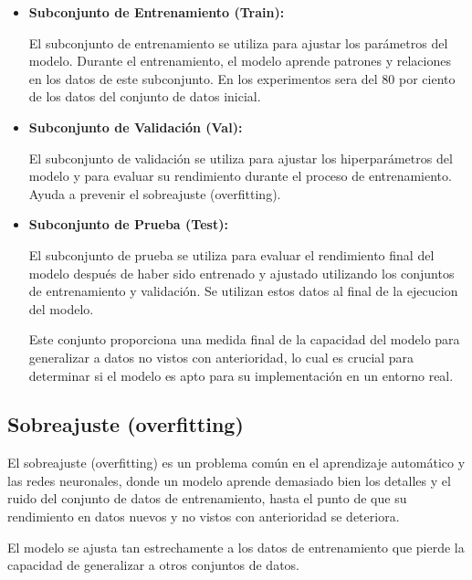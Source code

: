 \begin{itemize}
	
\item
\textbf{Subconjunto de Entrenamiento (Train):}

	El subconjunto de entrenamiento se utiliza para ajustar los parámetros del modelo. Durante el entrenamiento, el modelo aprende patrones y relaciones en los datos de este subconjunto. En los experimentos sera del 80 por ciento de los datos del conjunto de datos inicial.

\item 
\textbf{Subconjunto de Validación (Val):}

	El subconjunto de validación se utiliza para ajustar los hiperparámetros del modelo y para evaluar su rendimiento durante el proceso de entrenamiento. Ayuda a prevenir el sobreajuste (overfitting). 
	
\item 
\textbf{Subconjunto de Prueba (Test):}


	El subconjunto de prueba se utiliza para evaluar el rendimiento final del modelo después de haber sido entrenado y ajustado utilizando los conjuntos de entrenamiento y validación. Se utilizan estos datos al final de la ejecucion del modelo.
	
	Este conjunto proporciona una medida final de la capacidad del modelo para generalizar a datos no vistos con anterioridad, lo cual es crucial para determinar si el modelo es apto para su implementación en un entorno real.
	
\end{itemize}



\subsection{Sobreajuste (overfitting)}

	El sobreajuste (overfitting) es un problema común en el aprendizaje automático y las redes neuronales, donde un modelo aprende demasiado bien los detalles y el ruido del conjunto de datos de entrenamiento, hasta el punto de que su rendimiento en datos nuevos y no vistos con anterioridad se deteriora. 
	
	El modelo se ajusta tan estrechamente a los datos de entrenamiento que pierde la capacidad de generalizar a otros conjuntos de datos.
	

